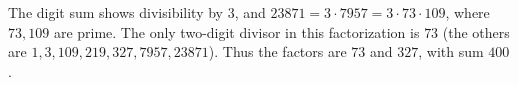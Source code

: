 The digit sum shows divisibility by $3$, and $23871=3\cdot7957=3\cdot73\cdot109$, where $73,109$ are prime. The only two-digit divisor in this factorization is $73$ (the others are $1,3,109,219,327,7957,23871$). Thus the factors are $73$ and $327$, with sum $\boxed{400}$.
